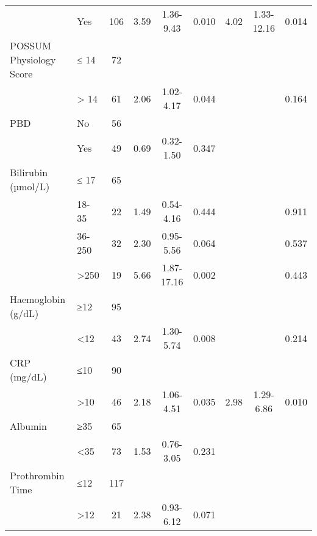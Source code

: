 \documentclass[]{article}
\begin{document}
\begin{sidewaystable}
\begin{tabular}{l l c c c c c c c}
		                        & Yes    & 106    & 3.59 & 1.36-9.43  & 0.010   & 4.02 & 1.33-12.16 & 0.014   \\
		POSSUM Physiology Score & ≤ 14   & 72     &      &            &         &      &            &  \\
		                        & > 14   & 61     & 2.06 & 1.02-4.17  & 0.044   &      &            & 0.164   \\
		PBD                     & No     & 56     &      &            &         &      &            &  \\
		                        & Yes    & 49     & 0.69 & 0.32-1.50  & 0.347   &      &            &  \\
		Bilirubin (µmol/L)      & ≤ 17   & 65     &      &            &         &      &            &  \\
		                        & 18-35  & 22     & 1.49 & 0.54-4.16  & 0.444   &      &            & 0.911   \\
		                        & 36-250 & 32     & 2.30 & 0.95-5.56  & 0.064   &      &            & 0.537   \\
		                        & >250   & 19     & 5.66 & 1.87-17.16 & 0.002   &      &            & 0.443   \\
		Haemoglobin (g/dL)      & ≥12    & 95     &      &            &         &      &            &  \\
		                        & <12    & 43     & 2.74 & 1.30-5.74  & 0.008   &      &            & 0.214   \\
		CRP (mg/dL)             & ≤10    & 90     &      &            &         &      &            &  \\
		                        & >10    & 46     & 2.18 & 1.06-4.51  & 0.035   & 2.98 & 1.29-6.86  & 0.010   \\
		Albumin                 & ≥35    & 65     &      &            &         &      &            &  \\
		                        & <35    & 73     & 1.53 & 0.76-3.05  & 0.231   &      &            &  \\
		Prothrombin Time        & ≤12    & 117    &      &            &         &      &            &  \\
		                        & >12    & 21     & 2.38 & 0.93-6.12  & 0.071   &      &            &
	\end{tabular}
\end{sidewaystable}


	
\end{document}
